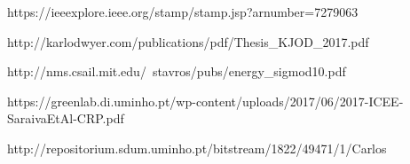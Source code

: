 https://ieeexplore.ieee.org/stamp/stamp.jsp?arnumber=7279063

http://karlodwyer.com/publications/pdf/Thesis_KJOD_2017.pdf

http://nms.csail.mit.edu/~stavros/pubs/energy_sigmod10.pdf

https://greenlab.di.uminho.pt/wp-content/uploads/2017/06/2017-ICEE-SaraivaEtAl-CRP.pdf

http://repositorium.sdum.uminho.pt/bitstream/1822/49471/1/Carlos%

